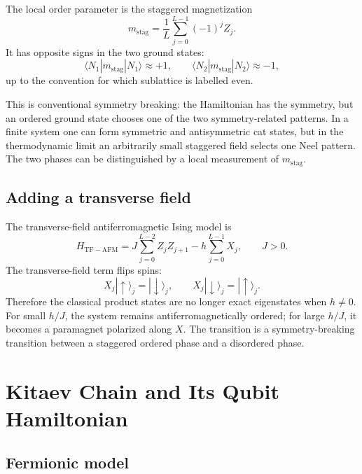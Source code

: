 \documentclass[11pt]{article}
\newcommand{\ket}[1]{|#1\rangle}
\newcommand{\bra}[1]{\langle#1|}
\newcommand{\up}{\uparrow}
\newcommand{\down}{\downarrow}
\begin{document}
The local order parameter is the staggered magnetization
\begin{equation}
  m_{\mathrm{stag}}
  =
  \frac{1}{L}\sum_{j=0}^{L-1}(-1)^j Z_j.
\end{equation}
It has opposite signs in the two ground states:
\begin{equation}
  \bra{N_1}m_{\mathrm{stag}}\ket{N_1}\approx +1,
  \qquad
  \bra{N_2}m_{\mathrm{stag}}\ket{N_2}\approx -1,
\end{equation}
up to the convention for which sublattice is labelled even.

This is conventional symmetry breaking: the Hamiltonian has the symmetry, but
an ordered ground state chooses one of the two symmetry-related patterns. In a
finite system one can form symmetric and antisymmetric cat states, but in the
thermodynamic limit an arbitrarily small staggered field selects one Neel
pattern. The two phases can be distinguished by a local measurement of
$m_{\mathrm{stag}}$.

\subsection{Adding a transverse field}

The transverse-field antiferromagnetic Ising model is
\begin{equation}
  H_{\mathrm{TF-AFM}}
  =
  J\sum_{j=0}^{L-2}Z_jZ_{j+1}
  -h\sum_{j=0}^{L-1}X_j,
  \qquad J>0.
\end{equation}
The transverse-field term flips spins:
\begin{equation}
  X_j\ket{\up}_j=\ket{\down}_j,
  \qquad
  X_j\ket{\down}_j=\ket{\up}_j.
\end{equation}
Therefore the classical product states are no longer exact eigenstates when
$h\neq 0$. For small $h/J$, the system remains antiferromagnetically ordered;
for large $h/J$, it becomes a paramagnet polarized along $X$. The transition is
a symmetry-breaking transition between a staggered ordered phase and a
disordered phase.

\section{Kitaev Chain and Its Qubit Hamiltonian}

\subsection{Fermionic model}
\end{document}
